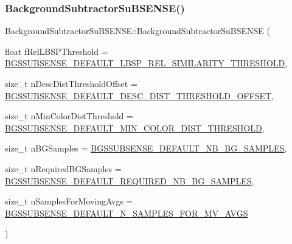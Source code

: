 \subsubsection{\texorpdfstring{Background\+Subtractor\+Su\+B\+S\+E\+N\+S\+E()}{BackgroundSubtractorSuBSENSE()}}
{\footnotesize\ttfamily Background\+Subtractor\+Su\+B\+S\+E\+N\+S\+E\+::\+Background\+Subtractor\+Su\+B\+S\+E\+N\+SE (\begin{DoxyParamCaption}\item[{float}]{f\+Rel\+L\+B\+S\+P\+Threshold = {\ttfamily \mbox{\hyperlink{_background_subtractor_su_b_s_e_n_s_e_8h_a125c1e09337744e8b4a35da8696dc5d4}{B\+G\+S\+S\+U\+B\+S\+E\+N\+S\+E\+\_\+\+D\+E\+F\+A\+U\+L\+T\+\_\+\+L\+B\+S\+P\+\_\+\+R\+E\+L\+\_\+\+S\+I\+M\+I\+L\+A\+R\+I\+T\+Y\+\_\+\+T\+H\+R\+E\+S\+H\+O\+LD}}},  }\item[{size\+\_\+t}]{n\+Desc\+Dist\+Threshold\+Offset = {\ttfamily \mbox{\hyperlink{_background_subtractor_su_b_s_e_n_s_e_8h_a6ac17a78aeb1fb0dab4833b50b80e43e}{B\+G\+S\+S\+U\+B\+S\+E\+N\+S\+E\+\_\+\+D\+E\+F\+A\+U\+L\+T\+\_\+\+D\+E\+S\+C\+\_\+\+D\+I\+S\+T\+\_\+\+T\+H\+R\+E\+S\+H\+O\+L\+D\+\_\+\+O\+F\+F\+S\+ET}}},  }\item[{size\+\_\+t}]{n\+Min\+Color\+Dist\+Threshold = {\ttfamily \mbox{\hyperlink{_background_subtractor_su_b_s_e_n_s_e_8h_ab2d581a6cf91dca26bb660c483cdb23c}{B\+G\+S\+S\+U\+B\+S\+E\+N\+S\+E\+\_\+\+D\+E\+F\+A\+U\+L\+T\+\_\+\+M\+I\+N\+\_\+\+C\+O\+L\+O\+R\+\_\+\+D\+I\+S\+T\+\_\+\+T\+H\+R\+E\+S\+H\+O\+LD}}},  }\item[{size\+\_\+t}]{n\+B\+G\+Samples = {\ttfamily \mbox{\hyperlink{_background_subtractor_su_b_s_e_n_s_e_8h_a0140353a9cb83ccce1209024d570ff28}{B\+G\+S\+S\+U\+B\+S\+E\+N\+S\+E\+\_\+\+D\+E\+F\+A\+U\+L\+T\+\_\+\+N\+B\+\_\+\+B\+G\+\_\+\+S\+A\+M\+P\+L\+ES}}},  }\item[{size\+\_\+t}]{n\+Required\+B\+G\+Samples = {\ttfamily \mbox{\hyperlink{_background_subtractor_su_b_s_e_n_s_e_8h_a3f30662673e2871e8f751e4ca1b433d1}{B\+G\+S\+S\+U\+B\+S\+E\+N\+S\+E\+\_\+\+D\+E\+F\+A\+U\+L\+T\+\_\+\+R\+E\+Q\+U\+I\+R\+E\+D\+\_\+\+N\+B\+\_\+\+B\+G\+\_\+\+S\+A\+M\+P\+L\+ES}}},  }\item[{size\+\_\+t}]{n\+Samples\+For\+Moving\+Avgs = {\ttfamily \mbox{\hyperlink{_background_subtractor_su_b_s_e_n_s_e_8h_acf2f1c0462353ddc7a51a6ed995a36ab}{B\+G\+S\+S\+U\+B\+S\+E\+N\+S\+E\+\_\+\+D\+E\+F\+A\+U\+L\+T\+\_\+\+N\+\_\+\+S\+A\+M\+P\+L\+E\+S\+\_\+\+F\+O\+R\+\_\+\+M\+V\+\_\+\+A\+V\+GS}}} }\end{DoxyParamCaption})}



